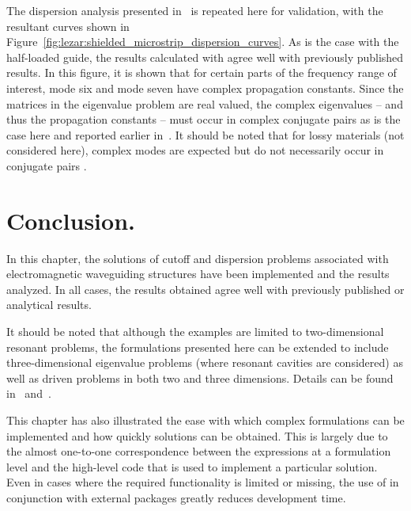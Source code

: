 The dispersion analysis presented in~\citet{PelosiCoccioliSelleri1998}
is repeated here for validation, with the resultant curves shown in
Figure~\ref{fig:lezar:shielded_microstrip_dispersion_curves}. As is the
case with the half-loaded guide, the results calculated with \fenics{}
agree well with previously published results. In this figure, it is shown
that for certain parts of the frequency range of interest, mode six
and mode seven have complex propagation constants. Since the matrices in the
eigenvalue problem are real valued, the complex eigenvalues -- and thus
the propagation constants -- must occur in complex conjugate pairs as
is the case here and reported earlier in~\citet{HuangItoh1988}. It
should be noted that for lossy materials (not considered here),
complex modes are expected but do not necessarily occur in conjugate
pairs \citep{PelosiCoccioliSelleri1998}.

\section{Conclusion.}

In this chapter, the solutions of cutoff and dispersion problems
associated with electromagnetic waveguiding structures have been
implemented and the results analyzed. In all cases, the results obtained
agree well with previously published or analytical results.

It should be noted that although the examples are limited to
two-dimensional resonant problems, the formulations presented here can
be extended to include three-dimensional eigenvalue problems (where
resonant cavities are considered) as well as driven problems in both
two and three dimensions. Details can be found in~\citet{Jin2002}
and~\citet{PelosiCoccioliSelleri1998}.

This chapter has also illustrated the ease with which complex formulations
can be implemented and how quickly solutions can be obtained. This
is largely due to the almost one-to-one correspondence between the
expressions at a formulation level and the high-level \fenics{} code
that is used to implement a particular solution. Even in cases where
the required functionality is limited or missing, the use of \fenics{}
in conjunction with external packages greatly reduces development time.


